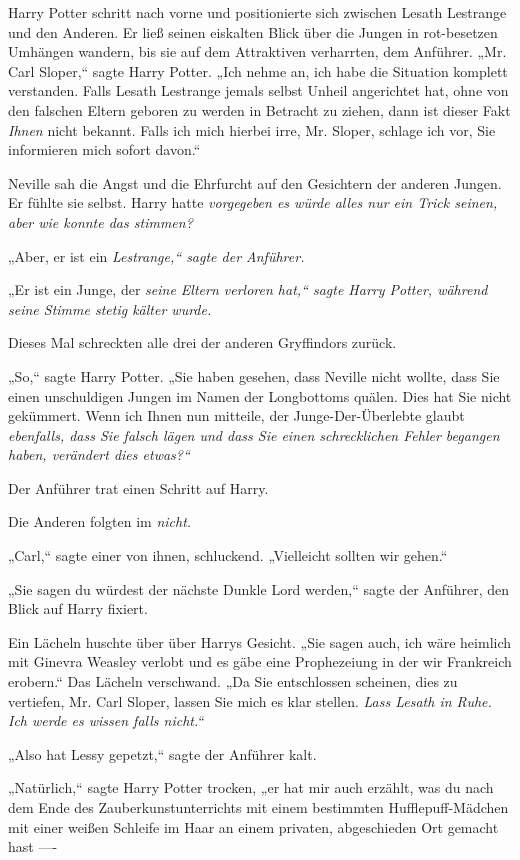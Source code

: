 {Harry Potter schritt nach vorne und positionierte sich zwischen Lesath Lestrange und den Anderen. Er ließ seinen eiskalten Blick über die Jungen in rot-besetzen Umhängen wandern, bis sie auf dem Attraktiven verharrten, dem Anführer. „Mr. Carl Sloper,“ sagte Harry Potter. „Ich nehme an, ich habe die Situation komplett verstanden. Falls Lesath Lestrange jemals selbst Unheil angerichtet hat, ohne von den falschen Eltern geboren zu werden in Betracht zu ziehen, dann ist dieser Fakt \emph{Ihnen} nicht bekannt. Falls ich mich hierbei irre, Mr. Sloper, schlage ich vor, Sie informieren mich sofort davon.“

Neville sah die Angst und die Ehrfurcht auf den Gesichtern der anderen Jungen. Er fühlte sie selbst. Harry hatte \emph{vorgegeben es würde alles nur ein Trick seinen, aber wie konnte das stimmen?}

„Aber, er ist ein \emph{Lestrange,“ sagte der Anführer.}

„Er ist ein Junge, der \emph{seine Eltern verloren hat,“ sagte Harry Potter, während seine Stimme stetig kälter wurde.}

Dieses Mal schreckten alle drei der anderen Gryffindors zurück.

„So,“ sagte Harry Potter. „Sie haben gesehen, dass Neville nicht wollte, dass Sie einen unschuldigen Jungen im Namen der Longbottoms quälen. Dies hat Sie nicht gekümmert. Wenn ich Ihnen nun mitteile, der Junge-Der-Überlebte glaubt \emph{ebenfalls, dass Sie falsch lägen und dass Sie einen schrecklichen Fehler begangen haben, verändert dies etwas?“}

Der Anführer trat einen Schritt auf Harry.

Die Anderen folgten im \emph{nicht.}

„Carl,“ sagte einer von ihnen, schluckend. „Vielleicht sollten wir gehen.“

„Sie sagen du würdest der nächste Dunkle Lord werden,“ sagte der Anführer, den Blick auf Harry fixiert.

Ein Lächeln huschte über über Harrys Gesicht. „Sie sagen auch, ich wäre heimlich mit Ginevra Weasley verlobt und es gäbe eine Prophezeiung in der wir Frankreich erobern.“ Das Lächeln verschwand. „Da Sie entschlossen scheinen, dies zu vertiefen, Mr. Carl Sloper, lassen Sie mich es klar stellen. \emph{Lass Lesath in Ruhe. Ich werde es wissen falls nicht.“}

„Also hat Lessy gepetzt,“ sagte der Anführer kalt.

„Natürlich,“ sagte Harry Potter trocken, „er hat mir auch erzählt, was du nach dem Ende des Zauberkunstunterrichts mit einem bestimmten Hufflepuff-Mädchen mit einer weißen Schleife im Haar an einem privaten, abgeschieden Ort gemacht hast ----

}
